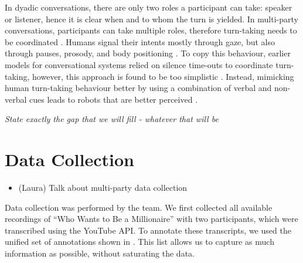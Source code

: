 \documentclass[hidelinks, 11pt]{article}
\begin{document}
In dyadic conversations, there are only two roles a participant can take: speaker or listener, hence it is clear when and to whom the turn is yielded. In multi-party conversations, participants can take multiple roles, therefore turn-taking needs to be coordinated \cite{Johansson_Skantze_2015}. Humans signal their intents mostly through gaze, but also through pauses, prosody, and body positioning \cite{Żarkowski_2019}. To copy this behaviour, earlier models for conversational systems relied on silence time-outs to coordinate turn-taking, however, this approach is found to be too simplistic \cite{skantze_turn_taking_2021}. Instead, mimicking human turn-taking behaviour better by using a combination of verbal and non-verbal cues leads to robots that are better perceived \cite{moujahid_multi_party_2022}.

\textit{State exactly the gap that we will fill - whatever that will be}


\section{Data Collection}
\label{sec:data_collection}

\begin{itemize}
  \item (Laura) Talk about multi-party data collection
\end{itemize}

Data collection was performed by the team. We first collected all available recordings of ``Who Wants to Be a Millionaire'' with two participants, which were transcribed using the YouTube API. To annotate these transcripts, we used the unified set of annotations shown in . This list allows us to capture as much information as possible, without saturating the data.

\end{document}
